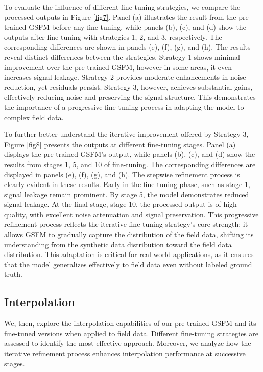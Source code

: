 To evaluate the influence of different fine-tuning strategies, we compare the processed outputs in Figure \ref{fig7}. Panel (a) illustrates the result from the pre-trained GSFM before any fine-tuning, while panels (b), (c), and (d) show the outputs after fine-tuning with strategies 1, 2, and 3, respectively. The corresponding differences are shown in panels (e), (f), (g), and (h). The results reveal distinct differences between the strategies. Strategy 1 shows minimal improvement over the pre-trained GSFM, however in some areas, it even increases signal leakage. Strategy 2 provides moderate enhancements in noise reduction, yet residuals persist. Strategy 3, however, achieves substantial gains, effectively reducing noise and preserving the signal structure. This demonstrates the importance of a progressive fine-tuning process in adapting the model to complex field data. 

To further better understand the iterative improvement offered by Strategy 3, Figure \ref{fig8} presents the outputs at different fine-tuning stages. Panel (a) displays the pre-trained GSFM's output, while panels (b), (c), and (d) show the results from stages 1, 5, and 10 of fine-tuning. The corresponding differences are displayed in panels (e), (f), (g), and (h). The stepwise refinement process is clearly evident in these results. Early in the fine-tuning phase, such as stage 1, signal leakage remain prominent. By stage 5, the model demonstrates reduced signal leakage. At the final stage, stage 10, the processed output is of high quality, with excellent noise attenuation and signal preservation. This progressive refinement process reflects the iterative fine-tuning strategy's core strength: it allows GSFM to gradually capture the distribution of the field data, shifting its understanding from the synthetic data distribution toward the field data distribution. This adaptation is critical for real-world applications, as it ensures that the model generalizes effectively to field data even without labeled ground truth. 

\subsection{Interpolation}
We, then, explore the interpolation capabilities of our pre-trained GSFM and its fine-tuned versions when applied to field data. Different fine-tuning strategies are assessed to identify the most effective approach. Moreover, we analyze how the iterative refinement process enhances interpolation performance at successive stages. 

